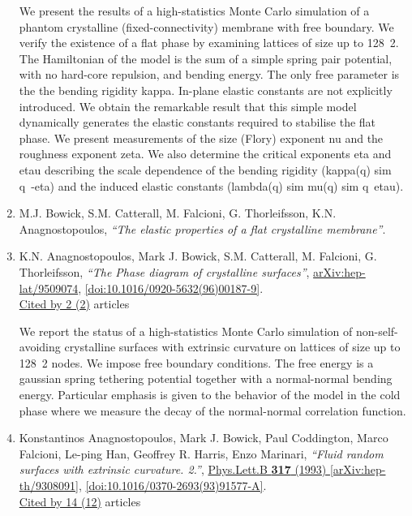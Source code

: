 \documentclass[a4paper,10pt]{article}
\begin{document}
\begin{enumerate}
We present the results of a high-statistics Monte Carlo simulation of a phantom crystalline (fixed-connectivity) membrane with free boundary. We verify the existence of a flat phase by examining lattices of size up to 128~2. The Hamiltonian of the model is the sum of a simple spring pair potential, with no hard-core repulsion, and bending energy. The only free parameter is the the bending rigidity kappa. In-plane elastic constants are not explicitly introduced. We obtain the remarkable result that this simple model dynamically generates the elastic constants required to stabilise the flat phase. We present measurements of the size (Flory) exponent nu and the roughness exponent zeta. We also determine the critical exponents eta and etau describing the scale dependence of the bending rigidity (kappa(q) sim q~{-eta}) and the induced elastic constants (lambda(q) sim mu(q) sim q~{etau}).
\item M.J. Bowick, S.M. Catterall, M. Falcioni, G. Thorleifsson, K.N. Anagnostopoulos, {\it ``The elastic properties of a flat crystalline membrane''}.


\item K.N. Anagnostopoulos, Mark J. Bowick, S.M. Catterall, M. Falcioni, G. Thorleifsson, {\it ``The Phase diagram of crystalline surfaces''}, \href{https://arxiv.org/abs/hep-lat/9509074}{arXiv:hep-lat/9509074}, \href{https://www.doi.org/10.1016/0920-5632(96)00187-9}{[doi:10.1016/0920-5632(96)00187-9]}.
\\\href{https://inspirehep.net/literature/?q=refersto%3Arecid%3A399718}{Cited by 2 (2)} articles

We report the status of a high-statistics Monte Carlo simulation of non-self-avoiding crystalline surfaces with extrinsic curvature on lattices of size up to 128~2 nodes. We impose free boundary conditions. The free energy is a gaussian spring tethering potential together with a normal-normal bending energy. Particular emphasis is given to the behavior of the model in the cold phase where we measure the decay of the normal-normal correlation function.
\item Konstantinos Anagnostopoulos, Mark J. Bowick, Paul Coddington, Marco Falcioni, Le-ping Han, Geoffrey R. Harris, Enzo Marinari, {\it ``Fluid random surfaces with extrinsic curvature. 2.''}, \href{https://www.doi.org/10.1016/0370-2693(93)91577-A}{Phys.Lett.B {\bf 317} (1993) } \href{https://arxiv.org/abs/hep-th/9308091}{[arXiv:hep-th/9308091]}, \href{https://www.doi.org/10.1016/0370-2693(93)91577-A}{[doi:10.1016/0370-2693(93)91577-A]}.
\\\href{https://inspirehep.net/literature/?q=refersto%3Arecid%3A357395}{Cited by 14 (12)} articles


\end{enumerate}
\end{document}
